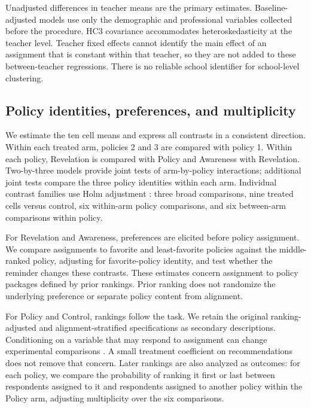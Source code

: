 Unadjusted differences in teacher means are the primary estimates. Baseline-adjusted models use only the demographic and professional variables collected before the procedure. HC3 covariance accommodates heteroskedasticity at the teacher level. Teacher fixed effects cannot identify the main effect of an assignment that is constant within that teacher, so they are not added to these between-teacher regressions. There is no reliable school identifier for school-level clustering.


\subsection{Policy identities, preferences, and multiplicity}
We estimate the ten cell means and express all contrasts in a consistent direction. Within each treated arm, policies 2 and 3 are compared with policy 1. Within each policy, Revelation is compared with Policy and Awareness with Revelation. Two-by-three models provide joint tests of arm-by-policy interactions; additional joint tests compare the three policy identities within each arm. Individual contrast families use Holm adjustment \cite{holm}: three broad comparisons, nine treated cells versus control, six within-arm policy comparisons, and six between-arm comparisons within policy.

For Revelation and Awareness, preferences are elicited before policy assignment. We compare assignments to favorite and least-favorite policies against the middle-ranked policy, adjusting for favorite-policy identity, and test whether the reminder changes these contrasts. These estimates concern assignment to policy packages defined by prior rankings. Prior ranking does not randomize the underlying preference or separate policy content from alignment.

For Policy and Control, rankings follow the task. We retain the original ranking-adjusted and alignment-stratified specifications as secondary descriptions. Conditioning on a variable that may respond to assignment can change experimental comparisons \cite{post}. A small treatment coefficient on recommendations does not remove that concern. Later rankings are also analyzed as outcomes: for each policy, we compare the probability of ranking it first or last between respondents assigned to it and respondents assigned to another policy within the Policy arm, adjusting multiplicity over the six comparisons.

